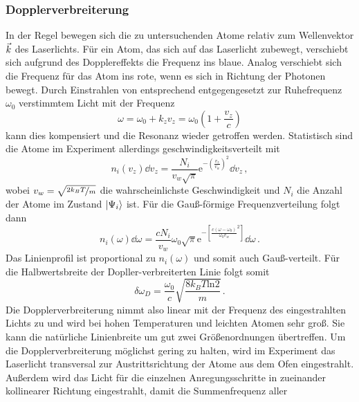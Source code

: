 \subsubsection{Dopplerverbreiterung}\label{subsubsec:doppler-verbreiterung}
In der Regel bewegen sich die zu untersuchenden Atome relativ zum Wellenvektor
$\vec{k}$ des Laserlichts. Für ein Atom, das sich auf das Laserlicht zubewegt,
verschiebt sich aufgrund des Dopplereffekts die Frequenz ins blaue. Analog
verschiebt sich die Frequenz für das Atom ins rote, wenn es sich in Richtung der Photonen bewegt. Durch Einstrahlen von entsprechend entgegengesetzt zur
Ruhefrequenz $\omega_0$ verstimmtem Licht mit der Frequenz
\begin{equation}\label{eq:doppler}
	\omega=\omega_0+k_zv_z=\omega_0\left(1+\frac{v_z}{c}\right)
\end{equation}
kann dies kompensiert und die Resonanz wieder getroffen werden. Statistisch sind
die Atome im Experiment allerdings geschwindigkeitsverteilt
\cite{demtroeder:laserspektroskopie} mit
\begin{equation}\label{eq:boltzmann-verteilung_v}
	n_i(v_z)\dd{v_z}=\frac{N_i}{v_w\sqrt{\pi}}\mathrm{e}^{-\left(\frac{v_z}{v_w}\right)^2}\dd{v_z}\,,
\end{equation}
wobei $v_w=\sqrt{\nicefrac{2k_BT}{m}}$ die wahrscheinlichste Geschwindigkeit und
$N_i$ die Anzahl der Atome im Zustand $|{\Psi_i}\rangle$ ist. Für die Gauß-förmige
Frequenzverteilung folgt dann
\begin{equation}\label{eq:boltzmann-verteilung_omega}
	n_i(\omega)\dd\omega=\frac{cN_i}{v_w}\omega_0\sqrt{\pi}\mathrm{e}^{-\left[\frac{c(\omega-\omega_0)}{\omega_0v_w}^2\right]}\dd\omega\,.
\end{equation}
Das Linienprofil ist proportional zu $n_i(\omega)$ und somit auch Gauß-verteilt.
Für die Halbwertsbreite der Dopller-verbreiterten Linie folgt somit  
\begin{equation}\label{eq:doppler-breite}
	\delta\omega_D=\frac{\omega_0}{c}\sqrt{\frac{8k_BT\mathrm{ln}2}{m}}\,.
\end{equation}
Die Dopplerverbreiterung nimmt also linear mit der Frequenz des eingestrahlten
Lichts zu und wird bei hohen Temperaturen und leichten Atomen sehr groß. Sie
kann die natürliche Linienbreite um gut zwei Größenordnungen übertreffen. Um die
Dopplerverbreiterung möglichst gering zu halten, wird im Experiment das
Laserlicht transversal zur Austrittsrichtung der Atome aus dem Ofen
eingestrahlt. Außerdem wird das Licht für die einzelnen Anregungsschritte in
zueinander kollinearer Richtung eingestrahlt, damit die Summenfrequenz aller
